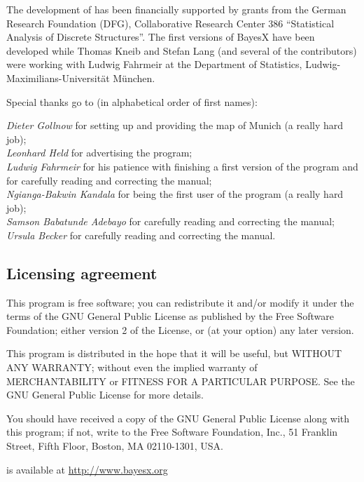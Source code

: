 { The development of \BayesX has been financially supported by grants from the German Research Foundation (DFG), Collaborative Research Center 386 ``Statistical Analysis of Discrete Structures''. The first versions of BayesX have been developed while Thomas Kneib and Stefan Lang (and several of the contributors) were working with Ludwig Fahrmeir at the Department of Statistics, Ludwig-Maximilians-Universit\"{a}t M\"{u}nchen.

 Special thanks go to (in alphabetical order of first names):

 {\em Dieter Gollnow} for setting up and providing the map of Munich (a really hard job); \\
 {\em Leonhard Held} for advertising the program; \\
 {\em Ludwig Fahrmeir} for his patience with finishing a first version of the program and for carefully reading and correcting the manual; \\
 {\em Ngianga-Bakwin Kandala} for being the first user of the program (a really hard job); \\
 {\em Samson Babatunde Adebayo} for carefully reading and correcting the manual; \\
 {\em Ursula Becker} for carefully reading and correcting the manual.

 \subsection*{Licensing agreement}

This program is free software; you can redistribute it and/or modify it under the terms of the GNU General Public License
as published by the Free Software Foundation; either version 2 of the License, or (at your option) any later version.

This program is distributed in the hope that it will be useful, but WITHOUT ANY WARRANTY; without even the implied warranty of MERCHANTABILITY or FITNESS FOR A PARTICULAR PURPOSE. See the GNU General Public License for more details.

You should have received a copy of the GNU General Public License along with this program; if not, write to the Free Software Foundation, Inc., 51 Franklin Street, Fifth Floor, Boston, MA  02110-1301, USA.

\vspace{0.5cm}

\BayesX is available at { \href{http://www.bayesx.org}{http://www.bayesx.org}}}
